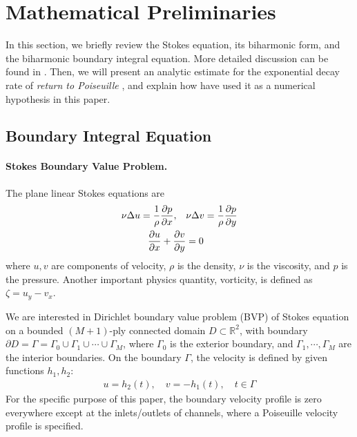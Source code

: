 \documentclass[10pt,twocolumn]{article}
\begin{document}
\section{Mathematical Preliminaries\label{mathprelim}}

In this section, we briefly review the Stokes equation, its biharmonic form,
and the biharmonic boundary integral equation. More detailed discussion can be found in \cite{greengardIntegralEquationMethods1996}. 
Then, we will present an analytic estimate for the exponential decay rate of 
\textit{return to Poiseuille} \cite{gregoryTractionBoundaryValue1980}, and explain how have 
used it as a numerical hypothesis in this paper.

\subsection{Boundary Integral Equation}

\paragraph{Stokes Boundary Value Problem.}

The plane linear Stokes equations are
\begin{align}
  \nu \Delta u = \frac 1 \rho \pdv{p}{x},\quad &\nu \Delta v = \frac 1\rho \pdv{p}{y} 
  \label{stokes} \\
  \pdv{u}{x} + \pdv{v}{y} &= 0
  \label{continuity}
\end{align}
where $u,v$ are components of velocity, 
$\rho$ is the density, 
$\nu$ is the viscosity, 
and $p$ is the pressure. 
Another important physics quantity, vorticity, is defined as $\zeta  = u_y - v_x$. 

We are interested in Dirichlet boundary value problem (BVP) of Stokes equation on 
a bounded $(M+1)$-ply connected domain $D\subset \mathbb R^2$,
with boundary $\partial D =  \Gamma = \Gamma_0 \cup \Gamma_1 \cup \cdots \cup \Gamma_M$, 
where $\Gamma_0$ is the exterior boundary, and $\Gamma_1,\cdots, \Gamma_M$ are the interior boundaries. 
On the boundary $\Gamma$, the velocity is defined by given functions $h_1,h_2$:
\begin{align}
  u = h_2(t),\quad v = - h_1(t), \quad t\in \Gamma
  \label{bdr-velocity}
\end{align}
For the specific purpose of this paper, 
the boundary velocity profile is zero everywhere except at the inlets/outlets
of channels, where a Poiseuille velocity profile is specified. 
\end{document}
